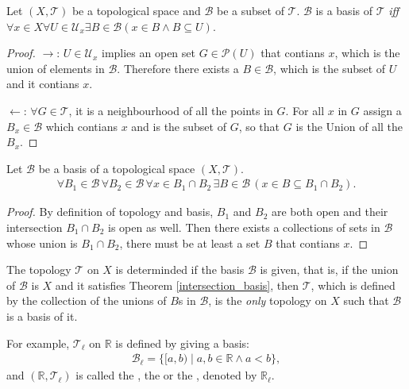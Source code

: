 \documentclass[openany]{book}
\begin{document}
\begin{theorem}\label{basis_iff_neighbourhood}
Let $(X,\mathscr T)$ be a topological space and $\mathscr B$ be a subset of $\mathscr T$.
$\mathscr B$ is a basis of $\mathscr T$ \emph{iff} 
$\forall x\in X
	\forall U\in \mathscr U_x
		\exists B\in \mathscr B(
			x\in B\wedge B\subseteq U)$.
\end{theorem}
\begin{proof}
$\to$:
$U\in \mathscr U_x$ implies an open set $G\in \mathscr P(U)$ that contians $x$, which is the union of elements in $\mathscr B$.
Therefore there exists a $B\in \mathscr B$, which is the subset of $U$ and it contians $x$.

$\leftarrow$: 
$\forall G\in \mathscr T$, it is a neighbourhood of all the points in $G$.
For all $x$ in $G$ assign a $B_x\in \mathscr B$ which contians $x$ and is the subset of $G$, so that $G$ is the Union of all the $B_x$.
\end{proof}

\begin{theorem}\label{intersection_basis}
Let $\mathscr B$ be a basis of a topological space $(X,\mathscr T)$.
\begin{align*}
	\forall B_1\in \mathscr B\,\forall B_2\in\mathscr B\,
		\forall x\in B_1\cap B_2 \,
			\exists B\in \mathscr B\,(x\in B\subseteq B_1\cap B_2).
\end{align*}
\end{theorem}
\begin{proof}
By definition of topology and basis, 
$B_1$ and $B_2$ are both open and their intersection $B_1\cap B_2$ is open as well.
Then there exists a collections of sets in $\mathscr B$ whose union is $B_1\cap B_2$, 
there must be at least a set $B$ that contians $x$.
\end{proof}

The topology $\mathscr T$ on $X$ is determinded if the basis $\mathscr B$ is given,
that is, if the union of $\mathscr B$ is $X$ and it satisfies Theorem \ref{intersection_basis}, 
then $\mathscr T$, which is defined by the collection of the unions of $B$s in $\mathscr B$,
is the \emph{only} topology on $X$ such that $\mathscr B$ is a basis of it. 

For example,  $\mathscr T_\ell$ on $\mathbb R$ is defined by giving a basis:
\begin{align*}
	\mathscr B_\ell = \{
		[a,b)\mid a,b\in \mathbb R \wedge a<b\},
\end{align*}
and $(\mathbb R,\mathscr T_\ell)$ is called the , the  or the , denoted by $\mathbb R_\ell$.
\end{document}
